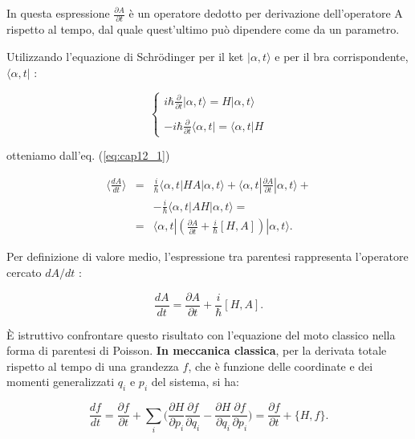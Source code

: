 In questa espressione $\frac{\partial A}{\partial{t}}$ è un operatore dedotto per derivazione dell'operatore A rispetto al tempo, dal quale quest'ultimo può dipendere come da un parametro.

Utilizzando l'equazione di Schr\"{o}dinger per il ket $|\alpha,t\rangle$ e per il bra corrispondente,   $\langle\alpha,t|$ :

\begin{equation}
\begin{cases}
\displaystyle{i\hbar\frac{\partial }{\partial{t}}|\alpha,t\rangle= H|\alpha,t\rangle }\\
\\
\displaystyle{-i\hbar\frac{\partial }{\partial{t}}\langle\alpha,t|= \langle\alpha,t|H } 
\end{cases}
\end{equation}

otteniamo dall'eq. (\ref{eq:cap12_1})

\begin{eqnarray}
\langle\frac{dA}{dt} \rangle &=& \frac{i}{\hbar} \langle\alpha,t|HA|\alpha,t\rangle + \langle \alpha,t|\frac{\partial A}{\partial{t}}|\alpha,t \rangle + \nonumber \\
& &-\frac{i}{\hbar} \langle \alpha,t|AH|\alpha,t\rangle=  \nonumber\\
&=& \langle \alpha,t| (\frac{\partial A}{\partial{t}} + \frac{i}{\hbar}[H,A] ) |\alpha,t\rangle .
\end{eqnarray}


Per definizione di valore medio, l'espressione tra parentesi rappresenta l'operatore cercato $dA/dt$ :

\begin{equation} \label{eq:cap12_2}
\frac{dA}{dt}= \frac{\partial A}{\partial{t}}+ \frac{i}{\hbar}[H,A].
\end{equation}

È istruttivo confrontare questo risultato con l'equazione del moto classico nella forma di parentesi di Poisson. \textbf{In meccanica classica}, per la derivata totale rispetto al tempo di una grandezza $f$, che è funzione delle coordinate e dei momenti generalizzati $q_i$ e $p_i$ del sistema, si ha:

 \begin{equation}
\frac{df}{dt}= \frac{\partial f}{\partial{t}} + \sum_{i}^{}{(\frac{\partial H}{\partial{p_i}}\frac{\partial f}{\partial{q_i}} - \frac{\partial H}{\partial{q_i}}\frac{\partial f}{\partial{p_i}}} )=
\frac{\partial f}{\partial{t}}+ \{H,f\}.
\end{equation}

